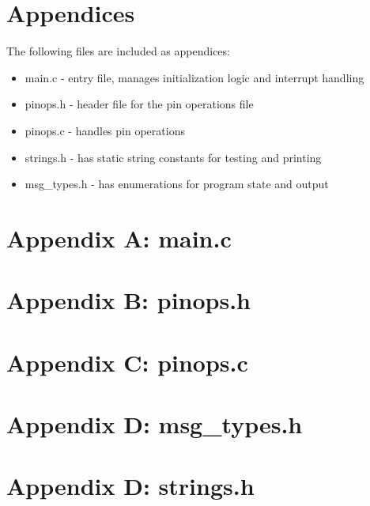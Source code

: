 \documentclass[letterpaper,11pt]{texMemo} %
\begin{document}
\section*{Appendices}
The following files are included as appendices:
\begin{itemize}
\item main.c - entry file, manages initialization logic and interrupt handling\\
\item pinops.h - header file for the pin operations file \\
\item pinops.c - handles pin operations\\
\item strings.h - has static string constants for testing and printing\\
\item msg\_types.h - has enumerations for program state and output\\
\end{itemize}
\newpage

\section*{Appendix A: main.c}
\begin{tiny}

\end{tiny}
\newpage
\section*{Appendix B: pinops.h}
\begin{tiny}

\end{tiny}
\newpage
\section*{Appendix C: pinops.c}
\begin{tiny}

\end{tiny}
\newpage
\section*{Appendix D: msg_types.h}
\begin{tiny}

\end{tiny}
\newpage
\section*{Appendix D: strings.h}
\begin{tiny}

\end{tiny}
\end{document}
